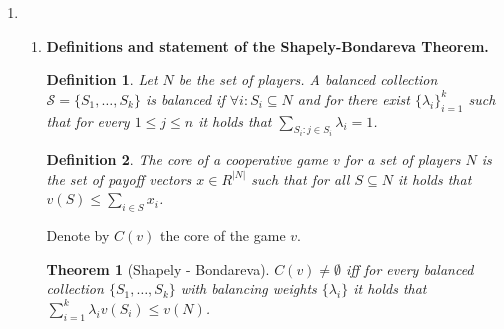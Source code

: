 \documentclass[11pt]{article} \usepackage{amssymb}
\newtheorem*{theorem*}{Theorem}
\newtheorem*{definition*}{Definition}
\begin{document}
\begin{enumerate}
\begin{enumerate}
\begin{enumerate}
      By Papademitriou's theorem the set of correlated equilibria is
      the convex hull of the Nash equilibria. Hence the set of
      achievable utilities is the triangle in $R^2$ with vertices at
      $(10,3)$, $(3,10)$ and $(30/13, 30/13)$.

    \item {\bf Prisoners' dilemma}

      The single trivial solution is $(-5,-5)$.
      
      \vspace{0.1in}
      {\bf Battle of the sexes}

      In this case each player can guarantee an expected payoff of
      $30/13$ by playing the mixed Nash strategy. Hence
      $u^*=v^*=30/13$. Since Nash bargaining is Pareto efficient the
      solution must lie on the line segment connecting $(10,3)$ and
      $(3,10)$. Since Nash Bargaining is symmetric, and since the
      feasible set is symmetric, then the solution must lie in the
      middle of the line segment, and in fact be achieved by the
      correlated equilibrium we mentioned earlier, with payoffs
      $(13/2,13/2)$.

    \end{enumerate}
  \end{enumerate}
\item
  \begin{enumerate}
  \item 
    {\bf Definitions and statement of the Shapely-Bondareva Theorem.}
    \begin{definition*}
      Let $N$ be the set of players. A {\em balanced collection}
      $\mathcal{S} = \{S_1,\ldots,S_k\}$ is balanced if $\forall i:
      S_i \subseteq N$ and for there exist $\{\lambda_i\}_{i=1}^k$
      such that for every $1 \leq j \leq n$ it holds that $\sum_{S_i:j
        \in S_i}\lambda_i=1$.
    \end{definition*}
    \begin{definition*}
      The {\em core} of a cooperative game $v$ for a set of players
      $N$ is the set of payoff vectors $x \in R^{|N|}$ such that for
      all $S \subseteq N$ it holds that $v(S) \leq \sum_{i \in S}x_i$.
    \end{definition*}
    Denote by $C(v)$ the core of the game $v$.
    \begin{theorem*}[Shapely - Bondareva]
      $C(v) \neq \emptyset$ iff for every balanced collection
      $\{S_1,\ldots,S_k\}$ with balancing weights $\{\lambda_i\}$ it
      holds that $\sum_{i=1}^k\lambda_iv(S_i) \leq v(N)$.
    \end{theorem*}


\end{enumerate}
\end{enumerate}
\end{document}
